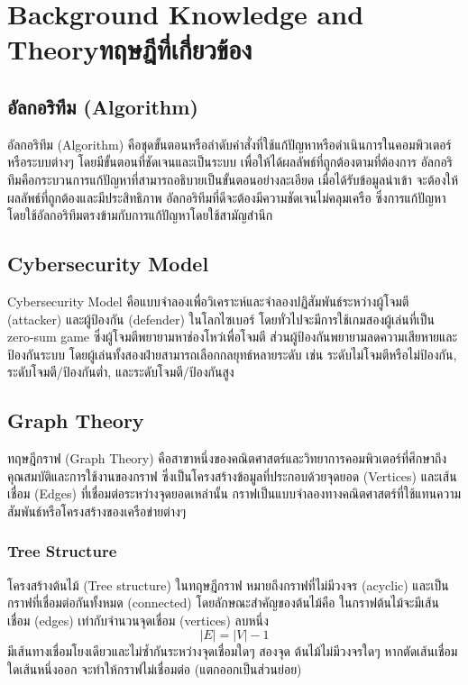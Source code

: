 \chapter{\ifenglish Background Knowledge and Theory\else ทฤษฎีที่เกี่ยวข้อง\fi}

\section{อัลกอริทึม (Algorithm)}
อัลกอริทึม (Algorithm) คือชุดขั้นตอนหรือลำดับคำสั่งที่ใช้แก้ปัญหาหรือดำเนินการในคอมพิวเตอร์หรือระบบต่างๆ โดยมีขั้นตอนที่ชัดเจนและเป็นระบบ เพื่อให้ได้ผลลัพธ์ที่ถูกต้องตามที่ต้องการ อัลกอริทึมคือกระบวนการแก้ปัญหาที่สามารถอธิบายเป็นขั้นตอนอย่างละเอียด เมื่อได้รับข้อมูลนำเข้า จะต้องให้ผลลัพธ์ที่ถูกต้องและมีประสิทธิภาพ อัลกอริทึมที่ดีจะต้องมีความชัดเจนไม่คลุมเครือ ซึ่งการแก้ปัญหาโดยใช้อัลกอริทึมตรงข้ามกับการแก้ปัญหาโดยใช้สามัญสํานึก

\section{Cybersecurity Model}
Cybersecurity Model คือแบบจำลองเพื่อวิเคราะห์และจำลองปฏิสัมพันธ์ระหว่างผู้โจมตี (attacker) และผู้ป้องกัน (defender) ในโลกไซเบอร์ โดยทั่วไปจะมีการใช้เกมสองผู้เล่นที่เป็น zero-sum game ซึ่งผู้โจมตีพยายามหาช่องโหว่เพื่อโจมตี ส่วนผู้ป้องกันพยายามลดความเสียหายและป้องกันระบบ โดยผู้เล่นทั้งสองฝ่ายสามารถเลือกกลยุทธ์หลายระดับ เช่น ระดับไม่โจมตีหรือไม่ป้องกัน, ระดับโจมตี/ป้องกันต่ำ, และระดับโจมตี/ป้องกันสูง

\section{Graph Theory}
ทฤษฎีกราฟ (Graph Theory) คือสาขาหนึ่งของคณิตศาสตร์และวิทยาการคอมพิวเตอร์ที่ศึกษาถึงคุณสมบัติและการใช้งานของกราฟ ซึ่งเป็นโครงสร้างข้อมูลที่ประกอบด้วยจุดยอด (Vertices) และเส้นเชื่อม (Edges) ที่เชื่อมต่อระหว่างจุดยอดเหล่านั้น กราฟเป็นแบบจำลองทางคณิตศาสตร์ที่ใช้แทนความสัมพันธ์หรือโครงสร้างของเครือข่ายต่างๆ

\subsection{Tree Structure}
โครงสร้างต้นไม้ (Tree structure) ในทฤษฎีกราฟ หมายถึงกราฟที่ไม่มีวงจร (acyclic) และเป็นกราฟที่เชื่อมต่อกันทั้งหมด (connected) โดยลักษณะสำคัญของต้นไม้คือ ในกราฟต้นไม้จะมีเส้นเชื่อม (edges) เท่ากับจำนวนจุดเชื่อม (vertices) ลบหนึ่ง 
\[
|E| = |V| - 1
\]
มีเส้นทางเชื่อมโยงเดียวและไม่ซ้ำกันระหว่างจุดเชื่อมใดๆ สองจุด ต้นไม้ไม่มีวงจรใดๆ หากตัดเส้นเชื่อมใดเส้นหนึ่งออก จะทำให้กราฟไม่เชื่อมต่อ (แตกออกเป็นส่วนย่อย)  

